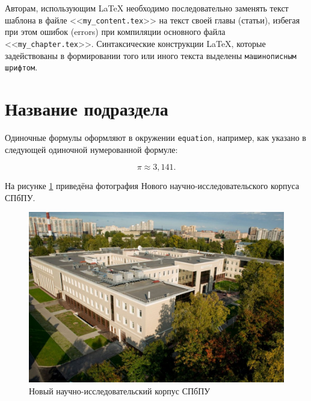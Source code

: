 \begin{refsection}
Авторам, использующим \LaTeX{} необходимо последовательно заменять текст шаблона в файле <<\verb|my_content.tex|>> на текст своей главы (статьи), избегая при этом ошибок (errors) при компиляции основного файла <<\verb|my_chapter.tex|>>. Синтаксические конструкции \LaTeX, которые задействованы в формировании того или иного текста выделены \texttt{машинописным шрифтом}.

	\section{Название подраздела} \label{ch-11:title-abbr} %


Одиночные формулы оформляют в окружении \texttt{equation}, например, как указано в следующей одиночной нумерованной формуле:
	
	\begin{equation}
	\label{eq:Pi}
	 \pi \approx 3,141.
	\end{equation}


	


На рисунке \ref{fig:spbpu-new-bld-autumn} приведёна фотография Нового научно-исследовательского корпуса СПбПУ.

	\begin{figure}[ht] 
	\center
	\includegraphics [scale=0.27] {my_folder/images/spbpu_new_bld_autumn}
	\caption{Новый научно-исследовательский корпус СПбПУ \cite{spbpu-gallery}} 
	\label{fig:spbpu-new-bld-autumn}  
	\end{figure}
	



\end{refsection}
